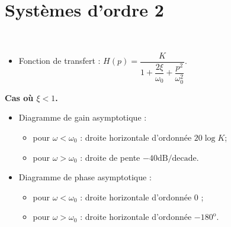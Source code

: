 \documentclass[10pt,fleqn]{article} %
\begin{document}
\section{Systèmes d'ordre 2}
\begin{resultat} ~\\

\vspace{-.5cm}

\noindent\begin{minipage}[c]{.53\linewidth}
\begin{itemize}
\item Fonction de transfert : $H(p)=\dfrac{K}{1+\dfrac{2\xi}{\omega_0}+\dfrac{p^2}{\omega_0^2}}$.
\end{itemize}
\begin{center}
\textbf{Cas où $\xi<1$.}
\end{center}
\begin{itemize}
\item Diagramme de gain asymptotique : 
\begin{itemize}
\item pour $\omega<\omega_0$ : droite horizontale d'ordonnée $20 \log K$;
\item pour $\omega>\omega_0$ : droite de pente $-{40}\text{dB/decade}$.
\end{itemize}
\item Diagramme de phase asymptotique : 
\begin{itemize}
\item pour $\omega<\omega_0$ : droite horizontale d'ordonnée 0 \degre;
\item pour $\omega>\omega_0$ : droite horizontale d'ordonnée $-180^{\text{o}}$.
\end{itemize}
\end{itemize}
\end{minipage} \hfill
\begin{minipage}[c]{.45\linewidth}

\end{minipage}


\end{resultat}
\end{document}
